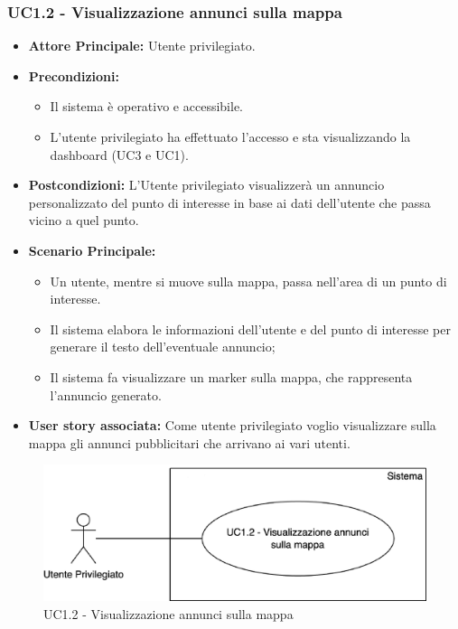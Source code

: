 \documentclass[11pt]{article}
\begin{document}
\begin{justify}
\subsubsection{\textbf{UC1.2 - Visualizzazione annunci sulla mappa}}
\begin{itemize}
    \item \textbf{Attore Principale:} Utente privilegiato.
    \item \textbf{Precondizioni:} 
        \begin{itemize}
         \item Il sistema è operativo e accessibile.
    	\item L'utente privilegiato ha effettuato l'accesso e sta          visualizzando la dashboard (UC3 e UC1).
        \end{itemize}
    \item \textbf{Postcondizioni:} L'Utente privilegiato visualizzerà un annuncio personalizzato del punto di interesse in base ai dati dell'utente che passa vicino a quel punto. 
    \item \textbf{Scenario Principale:} 
        \begin{itemize}
    	\item Un utente, mentre si muove sulla mappa, passa nell'area      di un punto di interesse.
    	\item Il sistema elabora le informazioni dell'utente e del         punto di interesse per generare il testo dell'eventuale            annuncio;
        \item Il sistema fa visualizzare un marker sulla mappa, che rappresenta l'annuncio generato.
	\end{itemize}
    \item \textbf{User story associata:} Come utente privilegiato voglio visualizzare sulla mappa gli annunci pubblicitari che arrivano ai vari utenti.
\end{itemize}
\begin{figure}[H]
    \centering
    \includegraphics[width=0.5\linewidth]{UC1.2image.png}
    \caption{UC1.2 - Visualizzazione annunci sulla mappa}
    \label{fig:UC1.2}
\end{figure}

\end{justify}
\end{document}
